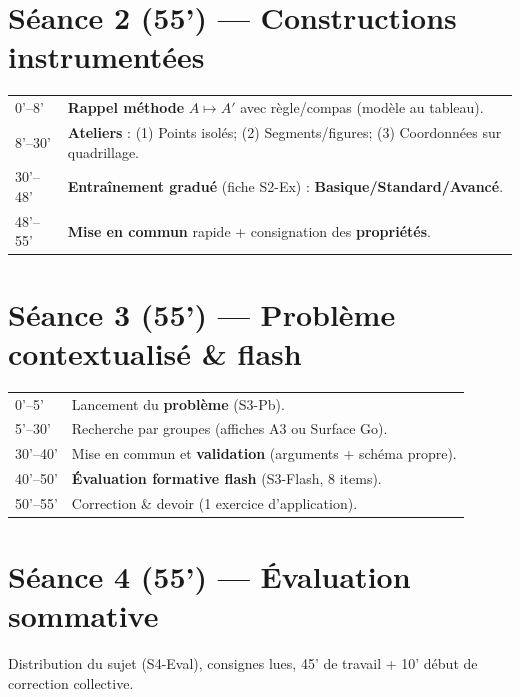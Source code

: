 \section*{Séance 2 (55') — Constructions instrumentées}
\begin{tcolorbox}[title=Plan minute par minute]
	\begin{tabular}{p{2.5cm} p{12.5cm}}
		0'–8' & \textbf{Rappel méthode} $A \mapsto A'$ avec règle/compas (modèle au tableau). \\
		8'–30' & \textbf{Ateliers} : (1) Points isolés; (2) Segments/figures; (3) Coordonnées sur quadrillage. \\
		30'–48' & \textbf{Entraînement gradué} (fiche S2-Ex) : \textbf{Basique/Standard/Avancé}. \\
		48'–55' & \textbf{Mise en commun} rapide + consignation des \textbf{propriétés}. 
	\end{tabular}
\end{tcolorbox}

\section*{Séance 3 (55') — Problème contextualisé \& flash}
\begin{tcolorbox}[title=Plan minute par minute]
	\begin{tabular}{p{2.5cm} p{12.5cm}}
		0'–5'  & Lancement du \textbf{problème} (S3-Pb). \\
		5'–30' & Recherche par groupes (affiches A3 ou Surface Go). \\
		30'–40'& Mise en commun et \textbf{validation} (arguments + schéma propre). \\
		40'–50'& \textbf{Évaluation formative flash} (S3-Flash, 8 items). \\
		50'–55'& Correction \& devoir (1 exercice d’application). 
	\end{tabular}
\end{tcolorbox}

\section*{Séance 4 (55') — Évaluation sommative}
Distribution du sujet (S4-Eval), consignes lues, 45' de travail + 10' début de correction collective.

